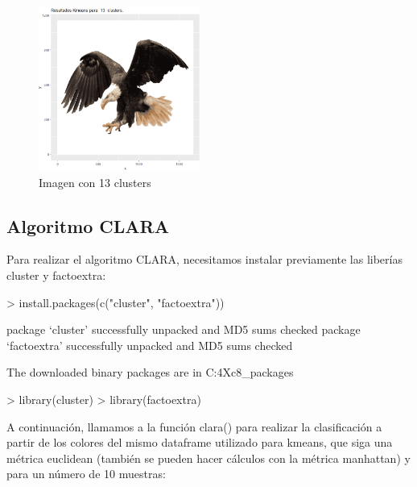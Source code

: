 \documentclass [a4paper] {article}
\begin{document}
\begin{figure}[!htbp]
  \centering
  \includegraphics[width=200px,keepaspectratio]{./eagle13clusters.png}
  \caption{Imagen con 13 clusters}
  \label{fig:original}
\end{figure}

\newpage

\subsection{Algoritmo CLARA}

Para realizar el algoritmo CLARA, necesitamos instalar previamente las liberías cluster y factoextra:

\begin{Schunk}
\begin{Sinput}
> install.packages(c("cluster", "factoextra"))
\end{Sinput}
\begin{Soutput}
package ‘cluster’ successfully unpacked and MD5 sums checked
package ‘factoextra’ successfully unpacked and MD5 sums checked

The downloaded binary packages are in
	C:\Users\Javier\AppData\Local\Temp\RtmpAZ4Xc8\downloaded_packages
\end{Soutput}
\begin{Sinput}
> library(cluster)
> library(factoextra)
\end{Sinput}
\end{Schunk}

A continuación, llamamos a la función clara() para realizar la clasificación a partir de los colores del mismo dataframe utilizado para kmeans, que siga una métrica euclidean (también se pueden hacer cálculos con la métrica manhattan) y para un número de 10 muestras:
\end{document}

